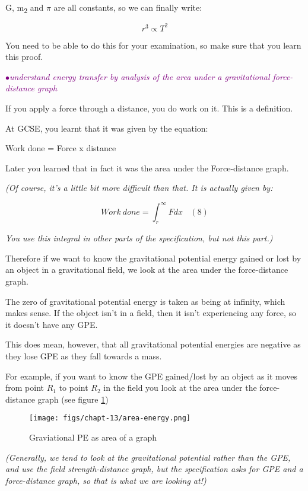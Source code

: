 \documentclass[a4paper,11pt,twoside]{memoir}
\newcounter{spec}[chapter]
\newcommand{\spec}[1]{\Needspace{5\baselineskip}\textcolor{purple}{$\bullet$\hspace{0.5cm}\textit{#1}}}
\begin{document}
G, m\textsubscript{2} and $\pi$ are all constants, so we can finally write:

\[r^{3} \propto T^{2}\]

You need to be able to do this for your examination, so make sure that
you learn this proof.

\spec{understand energy transfer by analysis of the area under a gravitational force-distance graph}

If you apply a force through a distance, you do work on it. This is a definition.

At GCSE, you learnt that it was given by the equation:

Work done = Force x distance

Later you learned that in fact it was the area under the Force-distance
graph.

\emph{(Of course, it's a little bit more difficult than that. It is
actually given by:}

\[Work\ done = \int_{r}^{\infty}{F{dx\ \ \ \ (8)}}\]

\emph{You use this integral in other parts of the specification, but not
this part.)}

Therefore if we want to know the gravitational potential energy gained
or lost by an object in a gravitational field, we look at the area under
the force-distance graph.

The zero of gravitational potential energy is taken as being at
infinity, which makes sense. If the object isn't in a field, then it
isn't experiencing any force, so it doesn't have any GPE.

This does mean, however, that all gravitational potential energies are
negative as they lose GPE as they fall towards a mass.

For example, if you want to know the GPE gained/lost by an object as it
moves from point $R_1$ to point $R_2$ in the field you look at the area under
the force-distance graph (see figure \ref{gpe-area})

\begin{figure}
  \begin{center}
  \texttt{[image: figs/chapt-13/area-energy.png]}
\end{center}
  \caption{Graviational PE as area of a graph}
  \label{gpe-area}
\end{figure}


\emph{(Generally, we tend to look at the gravitational potential rather
than the GPE, and use the field strength-distance graph, but the
specification asks for GPE and a force-distance graph, so that is what
we are looking at!)}
\end{document}

